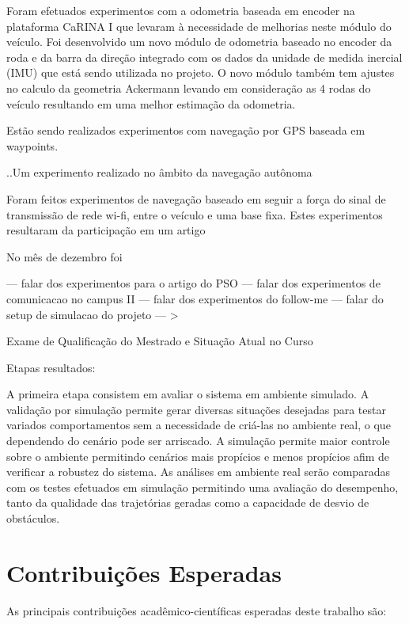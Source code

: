 \documentclass{article}
\begin{document}
Foram efetuados experimentos com a odometria baseada em encoder na plataforma
CaRINA I que levaram à necessidade de melhorias neste módulo do veículo. Foi
desenvolvido um novo módulo de odometria baseado no encoder da roda e da barra
da direção integrado com os dados da unidade de medida inercial (IMU) que está
sendo utilizada no projeto. O novo módulo também tem ajustes no calculo da
geometria Ackermann levando em consideração as 4 rodas do veículo resultando em
uma melhor estimação da odometria.


Estão sendo realizados experimentos com navegação por GPS baseada em waypoints. 

..Um experimento realizado no âmbito da navegação autônoma 


Foram feitos experimentos de navegação baseado em seguir a força do sinal de
transmissão de rede wi-fi, entre o veículo e uma base fixa. Estes experimentos
resultaram da participação em um artigo 


 No mês de dezembro foi 

 --- falar dos experimentos para o artigo do PSO
--- falar dos experimentos de comunicacao no campus II
--- falar dos experimentos do follow-me
--- falar do setup de simulacao do projeto
--- > 


Exame de Qualificação do Mestrado e Situação Atual no Curso



Etapas resultados:

A primeira etapa consistem em avaliar o sistema em ambiente simulado. A
validação por simulação permite gerar diversas situações desejadas para testar
variados comportamentos sem a necessidade de criá-las no ambiente real, o que
dependendo do cenário pode ser arriscado. A simulação permite maior controle
sobre o ambiente permitindo cenários mais propícios e menos propícios afim de
verificar a robustez do sistema. As análises em ambiente real serão comparadas
com os testes efetuados em simulação permitindo uma avaliação do desempenho,
tanto da qualidade das trajetórias geradas como a capacidade de desvio de
obstáculos.


\section{Contribuições Esperadas}

As principais contribuições acadêmico-científicas esperadas deste trabalho são: 
\end{document}
